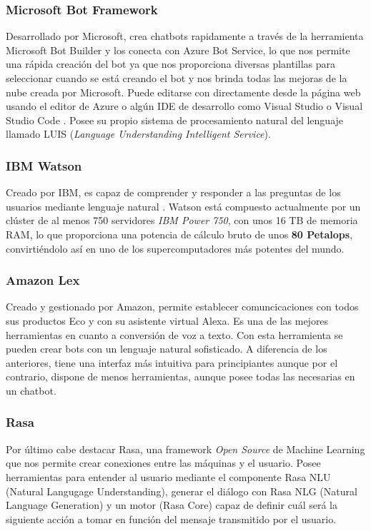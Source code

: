 \subsubsection{Microsoft Bot Framework}
Desarrollado por Microsoft, crea chatbots rapidamente a través de la herramienta Microsoft Bot Builder y los conecta con Azure Bot Service, lo que nos permite una rápida creación del bot ya que nos proporciona diversas plantillas para seleccionar cuando se está creando el bot y nos brinda todas las mejoras de la nube creada por Microsoft. Puede editarse con directamente desde la página web usando el editor de Azure o algún IDE de desarrollo como Visual Studio o Visual Studio Code \cite{MicrosoftBotBuilder}. Posee su propio sistema de procesamiento natural del lenguaje llamado LUIS (\textit{Language Understanding Intelligent Service}).  




\subsubsection{IBM Watson}
Creado por IBM, es capaz de comprender y responder a las preguntas de los usuarios mediante lenguaje natural \cite{MicrosoftBotBuilder}. Watson está compuesto actualmente por un clúster de al menos 750 servidores \textit{IBM Power 750}, con unos 16 TB de memoria RAM, lo que proporciona una potencia de cálculo bruto de unos \textbf{80 Petalops}, convirtiéndolo así en uno de los supercomputadores más potentes del mundo. 

\subsubsection{Amazon Lex}
Creado y gestionado por Amazon, permite establecer comuncicaciones con todos sus productos Eco y con su asistente virtual Alexa. Es una de las mejores herramientas en cuanto a conversión de voz a texto. Con esta herramienta se pueden crear bots con un lenguaje natural sofisticado. A diferencia de los anteriores, tiene una interfaz más intuitiva para principiantes aunque por el contrario, dispone de menos herramientas, aunque posee todas las necesarias en un chatbot.

\subsubsection{Rasa}
Por último cabe destacar Rasa, una framework \textit{Open Source} de Machine Learning que nos permite crear conexiones entre las máquinas y el usuario. Posee herramientas para entender al usuario mediante el componente Rasa NLU (Natural Langugage Understanding), generar el diálogo con Rasa NLG (Natural Language Generation) y un motor (Rasa Core) capaz de definir cuál será la siguiente acción a tomar en función del mensaje transmitido por el usuario.   


